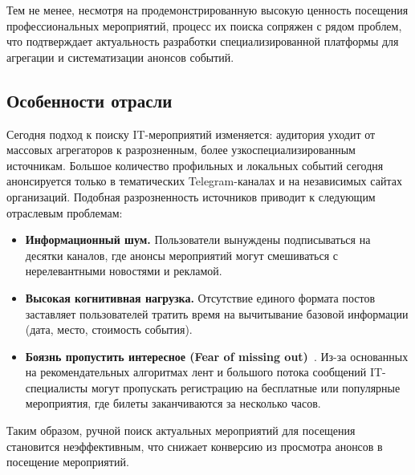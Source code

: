 Тем не менее, несмотря на продемонстрированную высокую ценность посещения профессиональных мероприятий, процесс их поиска сопряжен с рядом проблем, что подтверждает актуальность разработки специализированной платформы для агрегации и систематизации анонсов событий.

\subsection*{Особенности отрасли}
Сегодня подход к поиску IT-мероприятий изменяется: аудитория уходит от массовых агрегаторов к разрозненным, более узкоспециализированным источникам. 
Большое количество профильных и локальных событий сегодня анонсируется только в тематических Telegram-каналах и на независимых сайтах организаций. 
Подобная разрозненность источников приводит к следующим отраслевым проблемам:
\begin{itemize}
\item \textbf{Информационный шум.} Пользователи вынуждены подписываться на десятки каналов, где анонсы мероприятий могут смешиваться с нерелевантными новостями и рекламой.
\item \textbf{Высокая когнитивная нагрузка.} Отсутствие единого формата постов заставляет пользователей тратить время на вычитывание базовой информации (дата, место, стоимость события).
\item \textbf{Боязнь пропустить интересное (Fear of missing out)}~\cite{fomo_def}. Из-за основанных на рекомендательных алгоритмах лент и большого потока сообщений IT-специалисты могут пропускать регистрацию на бесплатные или популярные мероприятия, где билеты заканчиваются за несколько часов.
\end{itemize}
Таким образом, ручной поиск актуальных мероприятий для посещения становится неэффективным, что снижает конверсию из просмотра анонсов в посещение мероприятий.

